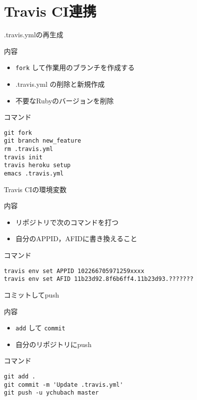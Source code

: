 \documentclass[t, aspectratio=169]{beamer}
\begin{document}
\section{Travis CI連携}
\label{sec-9-3}
\begin{frame}[fragile,label=sec-9-3-1]{.travis.ymlの再生成}
 \begin{block}{内容}
\begin{itemize}
\item \texttt{fork} して作業用のブランチを作成する
\item .travis.yml の削除と新規作成
\item 不要なRubyのバージョンを削除
\end{itemize}
\end{block}

\begin{block}{コマンド}
\begin{verbatim}
git fork
git branch new_feature
rm .travis.yml
travis init
travis heroku setup
emacs .travis.yml
\end{verbatim}
\end{block}
\end{frame}
\begin{frame}[fragile,label=sec-9-3-2]{Travis CIの環境変数}
 \begin{block}{内容}
\begin{itemize}
\item リポジトリで次のコマンドを打つ
\item 自分のAPPID，AFIDに書き換えること
\end{itemize}
\end{block}

\begin{block}{コマンド}
\begin{verbatim}
travis env set APPID 102266705971259xxxx
travis env set AFID 11b23d92.8f6b6ff4.11b23d93.???????
\end{verbatim}
\end{block}
\end{frame}
\begin{frame}[fragile,label=sec-9-3-3]{コミットしてpush}
 \begin{block}{内容}
\begin{itemize}
\item \texttt{add} して \texttt{commit}
\item 自分のリポジトリにpush
\end{itemize}
\end{block}

\begin{block}{コマンド}
\begin{verbatim}
git add .
git commit -m 'Update .travis.yml'
git push -u ychubach master
\end{verbatim}
\end{block}
\end{frame}
\end{document}
